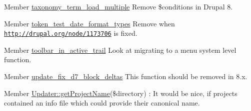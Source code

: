 \label{todo__todo000021}
\hypertarget{todo__todo000021}{}
 
\begin{DoxyDescription}
\item[Member \hyperlink{taxonomy_8module_add67d5d48fc273cf997a650cfb376cda}{taxonomy\_\-term\_\-load\_\-multiple} ]Remove \$conditions in Drupal 8. 
\end{DoxyDescription}

\label{todo__todo000071}
\hypertarget{todo__todo000071}{}
 
\begin{DoxyDescription}
\item[Member \hyperlink{token__test_8module_ae5274fe6510bcb89e53bd7e66c7deb43}{token\_\-test\_\-date\_\-format\_\-types} ]Remove when \href{http://drupal.org/node/1173706}{\tt http://drupal.org/node/1173706} is fixed. 
\end{DoxyDescription}

\label{todo__todo000022}
\hypertarget{todo__todo000022}{}
 
\begin{DoxyDescription}
\item[Member \hyperlink{toolbar_8module_ae0f25c4df3fe3bc3fa83bc0bdd3a8606}{toolbar\_\-in\_\-active\_\-trail} ]Look at migrating to a menu system level function. 
\end{DoxyDescription}

\label{todo__todo000007}
\hypertarget{todo__todo000007}{}
 
\begin{DoxyDescription}
\item[Member \hyperlink{update_8inc_a349ad25ac5547fbb44556538758988a2}{update\_\-fix\_\-d7\_\-block\_\-deltas} ]This function should be removed in 8.x.


\end{DoxyDescription}

\label{todo__todo000009}
\hypertarget{todo__todo000009}{}
 
\begin{DoxyDescription}
\item[Member \hyperlink{classUpdater_a092911b55da504e51b523dce6307b948}{Updater::getProjectName}(\$directory) ]: It would be nice, if projects contained an info file which could provide their canonical name.


\end{DoxyDescription}

\label{todo__todo000010}
\hypertarget{todo__todo000010}{}
 
